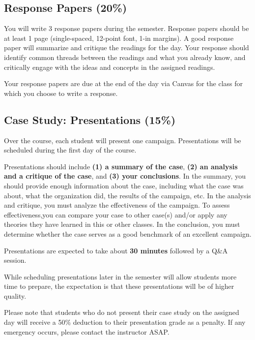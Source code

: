\documentclass[
  letterpaper,
]{article}
\begin{document}
\hypertarget{response-papers-20}{%
\subsection{Response Papers (20\%)}\label{response-papers-20}}

You will write 3 response papers during the semester. Response papers
should be at least 1 page (single-spaced, 12-point font, 1-in margins).
A good response paper will summarize and critique the readings for the
day. Your response should identify common threads between the readings
and what you already know, and critically engage with the ideas and
concepts in the assigned readings.

Your response papers are due at the end of the day via Canvas for the
class for which you choose to write a response.

\hypertarget{case-study-presentations-15}{%
\subsection{Case Study: Presentations
(15\%)}\label{case-study-presentations-15}}

Over the course, each student will present one campaign. Presentations
will be scheduled during the first day of the course.

Presentations should include \textbf{(1) a summary of the case},
\textbf{(2) an analysis and a critique of the case}, and \textbf{(3)
your conclusions}. In the summary, you should provide enough information
about the case, including what the case was about, what the organization
did, the results of the campaign, etc. In the analysis and critique, you
must analyze the effectiveness of the campaign. To assess
effectiveness,you can compare your case to other case(s) and/or apply
any theories they have learned in this or other classes. In the
conclusion, you must determine whether the case serves as a good
benchmark of an excellent campaign.

Presentations are expected to take about \textbf{30 minutes} followed by
a Q\&A session.

While scheduling presentations later in the semester will allow students
more time to prepare, the expectation is that these presentations will
be of higher quality.

Please note that students who do not present their case study on the
assigned day will receive a 50\% deduction to their presentation grade
as a penalty. If any emergency occurs, please contact the instructor
ASAP.
\end{document}
